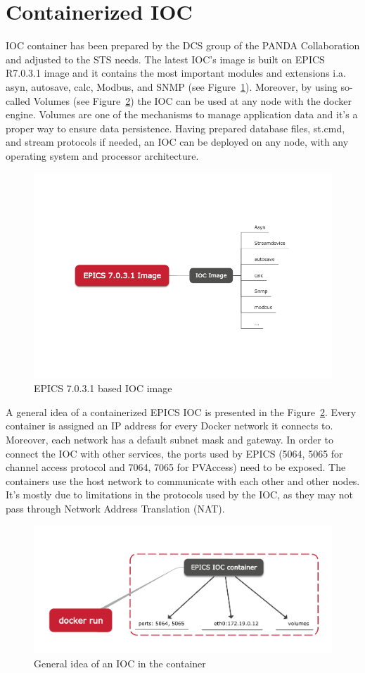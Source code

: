 \section{Containerized IOC}
IOC container has been prepared by the \gls{DCS} group of the \gls{PANDA} Collaboration and adjusted to the \gls{STS} needs. The latest \gls{IOC}'s image is built on EPICS R7.0.3.1 image and it contains the most important modules and extensions i.a. asyn, autosave, calc, Modbus, and SNMP (see Figure~\ref{fig_ioc1}). Moreover, by using so-called Volumes (see Figure~\ref{fig_doc}) the \gls{IOC} can be used at any node with the docker engine. Volumes are one of the mechanisms to manage application data and it's a proper way to ensure data persistence. Having prepared database files, st.cmd, and stream protocols if needed, an \gls{IOC} can be deployed on any node, with any operating system and processor architecture.
\begin{figure}[!h]
\centering
\includegraphics[width=0.65\columnwidth]{Chapter4/images/epics_ioc.png}
\caption{EPICS 7.0.3.1 based \gls{IOC} image}
\label{fig_ioc1}
\end{figure}
\newpage
A general idea of a containerized \gls{EPICS} \gls{IOC} is presented in the Figure~\ref{fig_doc}. Every container is assigned an IP address for every Docker network it connects to. Moreover, each network has a default subnet mask and gateway. In order to connect the \gls{IOC} with other services, the ports used by \gls{EPICS} (5064, 5065 for channel access protocol and 7064, 7065 for PVAccess) need to be exposed.  The containers use the host network to communicate with each other and other nodes. It's mostly due to limitations in the protocols used by the \gls{IOC}, as they may not pass through Network Address Translation (NAT).
\begin{figure}[!h]
\centering
\includegraphics[width=0.7\columnwidth]{Chapter4/images/docker_run.png}
\caption{General idea of an \gls{IOC} in the container}
\label{fig_doc}
\end{figure}
\newpage
